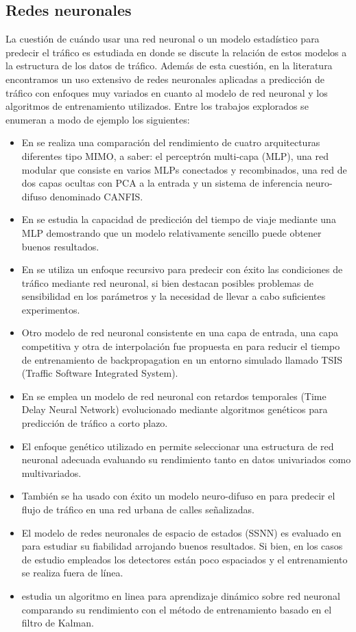 \documentclass{llncs}
\begin{document}
\subsection{Redes neuronales}
La cuestión de cuándo usar una red neuronal o un modelo estadístico para predecir el tráfico es estudiada en \cite{kirby1997should} donde se discute la relación de estos modelos a la estructura de los datos de tráfico. Además de esta cuestión, en la literatura encontramos un uso extensivo de redes neuronales aplicadas a predicción de tráfico con enfoques muy variados en cuanto al modelo de red neuronal y los algoritmos de entrenamiento utilizados. Entre los trabajos explorados se enumeran a modo de ejemplo los siguientes:

\begin{itemize}
\item En \cite{Ishak2004452} se realiza una comparación del rendimiento de cuatro arquitecturas diferentes tipo MIMO, a saber: el perceptrón multi-capa (MLP), una red modular que consiste en varios MLPs conectados y recombinados, una red de dos capas ocultas con PCA a la entrada y un sistema de inferencia neuro-difuso denominado CANFIS.
\item En \cite{Innamaa2005649} se estudia la capacidad de predicción del tiempo de viaje mediante una MLP demostrando que un modelo relativamente sencillo puede obtener buenos resultados.
\item En \cite{Zhang2000472} se utiliza un enfoque recursivo para predecir con éxito las condiciones de tráfico mediante red neuronal, si bien destacan posibles problemas de sensibilidad en los parámetros y la necesidad de llevar a cabo suficientes experimentos.
\item Otro modelo de red neuronal consistente en una capa de entrada, una capa competitiva y otra de interpolación fue  propuesta en \cite{Dharia2003607} para reducir el tiempo de entrenamiento de backpropagation en un entorno simulado llamado TSIS (Traffic Software Integrated System). 
\item En \cite{abdulhai2002short} se emplea un modelo de red neuronal con retardos temporales (Time Delay Neural Network) evolucionado mediante algoritmos genéticos para predicción de tráfico a corto plazo.
\item El enfoque genético utilizado en \cite{vlahogianni2005optimized} permite seleccionar una estructura de red neuronal adecuada evaluando su rendimiento tanto en datos univariados como multivariados.
\item También se ha usado con éxito un modelo neuro-difuso en \cite{yin2002urban} para predecir el flujo de tráfico en una red urbana de calles señalizadas.
\item El modelo de redes neuronales de espacio de estados (SSNN) es evaluado en \cite{van2006reliable} para estudiar su fiabilidad arrojando buenos resultados. Si bien, en los casos de estudio empleados los detectores están poco espaciados y el entrenamiento se realiza fuera de línea.
\item \cite{chen2001use} estudia un algoritmo en linea para aprendizaje dinámico sobre red neuronal comparando su rendimiento con el método de entrenamiento basado en el filtro de Kalman.
\end{itemize}
\end{document}
